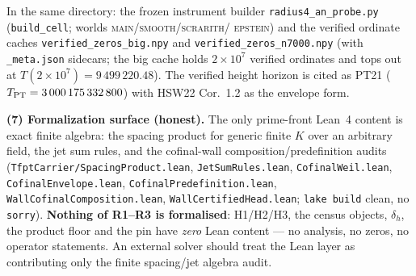 In the same directory: the frozen instrument
builder \texttt{radius4\_an\_probe.py} (\texttt{build\_cell}; worlds
\textsc{main}/\allowbreak\textsc{smooth}/\allowbreak\textsc{scrarith}/\allowbreak
\textsc{epstein}) and the verified ordinate caches \texttt{verified\_zeros\_big.npy} and
\texttt{verified\_zeros\_n7000.npy} (with \texttt{\_meta.json} sidecars; the big cache holds
$2\times10^{7}$ verified ordinates and tops out at $T(2\times10^{7}) = 9\,499\,220.48$).
The verified height horizon is cited as PT21
($T_{\rm PT} = 3\,000\,175\,332\,800$) with HSW22 Cor.~1.2 as the envelope form.


\par\smallskip\noindent\textbf{(7) Formalization surface (honest).}  The only prime-front
Lean~4 content is exact finite algebra: the spacing product for generic finite $K$ over an
arbitrary field, the jet sum rules, and the cofinal-wall composition/predefinition audits
(\texttt{TfptCarrier/SpacingProduct.lean}, \texttt{JetSumRules.lean},
\texttt{CofinalWeil.lean}, \texttt{CofinalEnvelope.lean}, \texttt{CofinalPredefinition.lean},
\texttt{WallCofinalComposition.lean}, \texttt{WallCertifiedHead.lean}; \texttt{lake build}
clean, no \texttt{sorry}).  \textbf{Nothing of R1--R3 is formalised}: H1/H2/H3, the census
objects, $\delta_h$, the product floor and the pin have \emph{zero} Lean content --- no
analysis, no zeros, no operator statements.  An external solver should treat the Lean layer as
contributing only the finite spacing/jet algebra audit.


